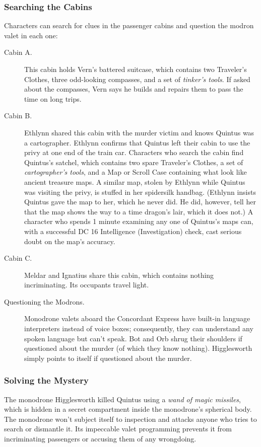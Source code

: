 \documentclass[10pt,a4paper,twoside,bg=print,twocolumn,openany,nodeprecatedcode]{dndbook}
\begin{document}
\subsubsection{Searching the Cabins}
Characters can search for clues in the passenger cabins and question the modron valet in each one:


\begin{description}
\item[Cabin A.]
This cabin holds Vern's battered suitcase, which contains two Traveler's Clothes, three odd-looking compasses, and a set of \textit{tinker's tools}. If asked about the compasses, Vern says he builds and repairs them to pass the time on long trips.
\item[Cabin B.]
Ethlynn shared this cabin with the murder victim and knows Quintus was a cartographer. Ethlynn confirms that Quintus left their cabin to use the privy at one end of the train car. Characters who search the cabin find Quintus's satchel, which contains two spare Traveler's Clothes, a set of \textit{cartographer's tools}, and a Map or Scroll Case containing what look like ancient treasure maps. A similar map, stolen by Ethlynn while Quintus was visiting the privy, is stuffed in her spidersilk handbag. (Ethlynn insists Quintus gave the map to her, which he never did. He did, however, tell her that the map shows the way to a time dragon's lair, which it does not.) A character who spends 1 minute examining any one of Quintus's maps can, with a successful DC 16 Intelligence (Investigation) check, cast serious doubt on the map's accuracy.
\item[Cabin C.]
Meldar and Ignatius share this cabin, which contains nothing incriminating. Its occupants travel light.
\item[Questioning the Modrons.]
Monodrone valets aboard the Concordant Express have built-in language interpreters instead of voice boxes; consequently, they can understand any spoken language but can't speak. Bot and Orb shrug their shoulders if questioned about the murder (of which they know nothing). Higglesworth simply points to itself if questioned about the murder.
\end{description}

\subsubsection{Solving the Mystery}
The monodrone Higglesworth killed Quintus using a \textit{wand of magic missiles}, which is hidden in a secret compartment inside the monodrone's spherical body. The monodrone won't subject itself to inspection and attacks anyone who tries to search or dismantle it. Its impeccable valet programming prevents it from incriminating passengers or accusing them of any wrongdoing.
\end{document}
